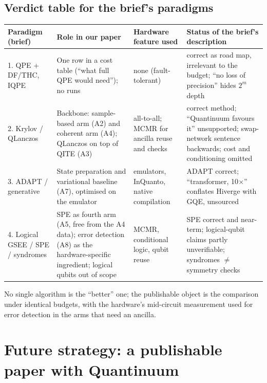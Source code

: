 \documentclass[11pt,a4paper]{article}
\newcommand{\takeaway}[1]{\par\smallskip\noindent{\bfseries\textcolor{keyblue}{Takeaway.}} #1\par\smallskip}
\begin{document}
\subsection{Verdict table for the brief's paradigms}
\begin{center}\small
\begin{tabularx}{\linewidth}{@{}L{3.1cm}YL{2.3cm}L{2.9cm}@{}}
\toprule
Paradigm (brief) & Role in our paper & Hardware feature used & Status of the brief's description\\. QPE + DF/THC, IQPE & One row in a cost table (``what full QPE would need''); no runs & none (fault-tolerant) & correct as road map, irrelevant to the budget; ``no loss of precision'' hides $2^m$ depth\\
2. Krylov / QLanczos & Backbone: sample-based arm (A2) and coherent arm (A4); QLanczos on top of QITE (A3) & all-to-all; MCMR for ancilla reuse and checks & correct method; ``Quantinuum favours it'' unsupported; swap-network sentence backwards; cost and conditioning omitted\\
3. ADAPT / generative & State preparation and variational baseline (A7), optimised on the emulator & emulators, InQuanto, native compilation & ADAPT correct; ``transformer, 10$\times$'' conflates Hiverge with GQE, unsourced\\
4. Logical GSEE / SPE / syndromes & SPE as fourth arm (A5, free from the A4 data); error detection (A8) as the hardware-specific ingredient; logical qubits out of scope & MCMR, conditional logic, qubit reuse & SPE correct and near-term; logical-qubit claims partly unverifiable; syndromes $\ne$ symmetry checks\\
\bottomrule
\end{tabularx}
\end{center}

\takeaway{No single algorithm is the ``better'' one; the publishable object is the comparison under identical budgets, with the hardware's mid-circuit measurement used for error detection in the arms that need an ancilla.}

\section{Future strategy: a publishable paper with Quantinuum}\label{sec:strategy}
\end{document}
